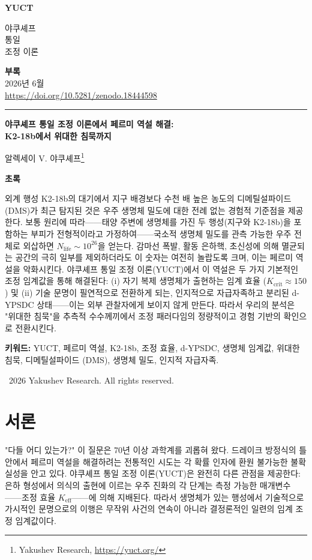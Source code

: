 \documentclass[11pt,a4paper]{article}
\newcommand{\Keff}{K_{\mathrm{eff}}}
\newcommand{\makeheader}{%
	\noindent
	\begin{minipage}{0.17\textwidth}
		\raggedright
		{\sffamily\bfseries\color{skyblue}\fontsize{46}{46}\selectfont YUCT}%
	\end{minipage}%
	\hspace{30pt}
	\begin{minipage}{0.32\textwidth}
		\raggedright
		{\sffamily\fontsize{11}{13}\selectfont 야쿠셰프\\ 통일\\ 조정 이론}%
	\end{minipage}%
	\hfill
	\begin{minipage}{0.38\textwidth}
		\raggedleft
		{\sffamily\bfseries 부록}\\
		{\sffamily 2026년 6월}\\
		{\sffamily\footnotesize \url{https://doi.org/10.5281/zenodo.18444598}}%
	\end{minipage}
	\par\vspace{5pt}
	\noindent\textcolor{gold}{\rule{\textwidth}{1.6pt}}
	\par\vspace{0pt}
}
\begin{document}
	\renewcommand{\thepage}{\arabic{page}}
	\thispagestyle{firstpage}
	\makeheader
	
	\vspace{0cm}
	{\LARGE\bfseries 야쿠셰프 통일 조정 이론에서 페르미 역설 해결:\\ K2-18b에서 위대한 침묵까지 \par}
	\vspace{0.2cm}
	
	{\large 알렉세이 V. 야쿠셰프\footnote{Yakushev Research, \url{https://yuct.org/}}} \\
	\vspace{0.0cm}
	
	{\color{darkblue}\textbf{\LARGE 초록}} \par
	{\large
		\noindent
		외계 행성 K2-18b의 대기에서 지구 배경보다 수천 배 높은 농도의 디메틸설파이드(DMS)가 최근 탐지된 것은 우주 생명체 밀도에 대한 전례 없는 경험적 기준점을 제공한다. 보통 원리에 따라——태양 주변에 생명체를 가진 두 행성(지구와 K2-18b)을 포함하는 부피가 전형적이라고 가정하여——국소적 생명체 밀도를 관측 가능한 우주 전체로 외삽하면 \(N_{\mathrm{life}} \sim 10^{26}\)을 얻는다. 감마선 폭발, 활동 은하핵, 초신성에 의해 멸균되는 공간의 극히 일부를 제외하더라도 이 숫자는 여전히 놀랍도록 크며, 이는 페르미 역설을 악화시킨다. 야쿠셰프 통일 조정 이론(YUCT)에서 이 역설은 두 가지 기본적인 조정 임계값을 통해 해결된다: (i) 자기 복제 생명체가 출현하는 임계 효율 (\(K_{\mathrm{crit}}\approx150\)) 및 (ii) 기술 문명이 필연적으로 전환하게 되는, 인지적으로 자급자족하고 분리된 d-YPSDC 상태——이는 외부 관찰자에게 보이지 않게 만든다. 따라서 우리의 분석은 "위대한 침묵"을 추측적 수수께끼에서 조정 패러다임의 정량적이고 경험 기반의 확인으로 전환시킨다.
	}
	
	\vspace{0.1cm}
	\noindent
	{\color{darkblue}\textbf{키워드:}} YUCT, 페르미 역설, K2-18b, 조정 효율, d-YPSDC, 생명체 임계값, 위대한 침묵, 디메틸설파이드 (DMS), 생명체 밀도, 인지적 자급자족.
	
	\vspace{0.5cm}
	\noindent
	\textcopyright\ 2026 Yakushev Research. All rights reserved.
	
	\tableofcontents
	\newpage
	
	\section{서론}
	\label{sec:intro}
	
	"다들 어디 있는가?" 이 질문은 70년 이상 과학계를 괴롭혀 왔다. 드레이크 방정식의 틀 안에서 페르미 역설을 해결하려는 전통적인 시도는 각 확률 인자에 환원 불가능한 불확실성을 안고 있다. 야쿠셰프 통일 조정 이론(YUCT)은 완전히 다른 관점을 제공한다: 은하 형성에서 의식의 출현에 이르는 우주 진화의 각 단계는 측정 가능한 매개변수——조정 효율 \(\Keff\)——에 의해 지배된다. 따라서 생명체가 있는 행성에서 기술적으로 가시적인 문명으로의 이행은 무작위 사건의 연속이 아니라 결정론적인 일련의 임계 조정 임계값이다.
	
\end{document}
